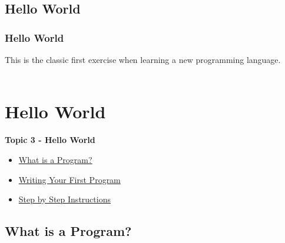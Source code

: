 \documentclass{ltx-talk} %
\newcommand{\sectionIIItitle}{Hello World}
\newcommand{\sectionIIsubsectionIVtitle}{Hello World}
\newcommand{\sectionIIIsubsectionItitle}{What is a Program?}
\newcommand{\sectionIIIsubsectionIItitle}{Writing Your First Program}
\newcommand{\sectionIIIsubsectionIIItitle}{Step by Step Instructions}
\newcommand{\sectionIIIsubsectionIVtitle}{-}
\begin{document}
		\subsection{\sectionIIsubsectionIVtitle}\label{sectionIIsubsectionIV}

			\begin{frame}
				\frametitle{\sectionIIsubsectionIVtitle}

				This is the classic first exercise when learning a new programming language. \vspace{10mm}\\

				 \vspace{3mm}\\

				\btVFill 
			\end{frame}
		
	\section{\sectionIIItitle}\label{sectionIII}

		\begin{frame}
			\large \textbf{Topic 3 - \sectionIIItitle} \vspace{3mm}\\

			\begin{itemize}
				\item \hyperlink{sectionIIIsubsectionI}{\sectionIIIsubsectionItitle} \vspc %
				\item \hyperlink{sectionIIIsubsectionII}{\sectionIIIsubsectionIItitle} \vspc %
				\item \hyperlink{sectionIIIsubsectionIII}{\sectionIIIsubsectionIIItitle} \vspc %
			\end{itemize}

		\end{frame}

		\subsection{\sectionIIIsubsectionItitle}\label{sectionIIIsubsectionI}
\end{document}
